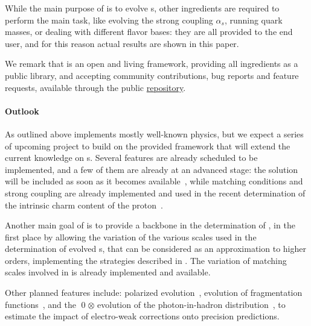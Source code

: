 While the main purpose of \eko{} is to evolve \pdf{}s, other \qcd{} ingredients
are required to perform the main task, like evolving the strong coupling
$\alpha_s$, running quark masses, or dealing with different flavor bases: they are
all provided to the end user, and for this reason actual results are shown in
this paper.

We remark that \eko{} is an open and living framework,
providing all ingredients as a public library, and accepting community
contributions, bug reports and feature requests, available through the public
\eko{} \href{https://github.com/N3PDF/eko/}{repository}.

\paragraph{Outlook} As outlined above \eko{} implements mostly well-known physics,
but we expect a series of upcoming project to build on the provided framework that will extend
the current knowledge on \pdf{}s.
Several features are already scheduled to be implemented,
and a few of them are already at an advanced stage:
the \nnnlo{} solution will be included as
soon as it becomes available~\cite{Moch:2021qrk}, while \nnnlo{} matching
conditions and strong coupling are already implemented and used in the
recent determination of the intrinsic charm content of the proton~\cite{Ball:2022qks}.

Another main goal of \eko{} is to provide a backbone in the determination of
\mhou{}, in the first place by allowing
the variation of the various scales used in the determination of evolved \pdf{}s,
that can be considered as an approximation to higher orders, implementing the
strategies described in \cite{AbdulKhalek:2019ihb}.
The variation of matching scales involved in \vfns{}
is already implemented and available.

Other planned features include: polarized evolution~\cite{Vogt:2008yw,Vogt:2014pha,Blumlein:2021ryt},
evolution of fragmentation functions~\cite{Mitov:2006ic,Moch:2007tx,Almasy:2011eq},
and the \qed$\otimes$\qcd{} evolution of
the photon-in-hadron distribution~\cite{Bertone:2017bme,Xie:2021equ,Cridge:2021pxm},
to estimate the impact of electro-weak corrections onto precision predictions. 

